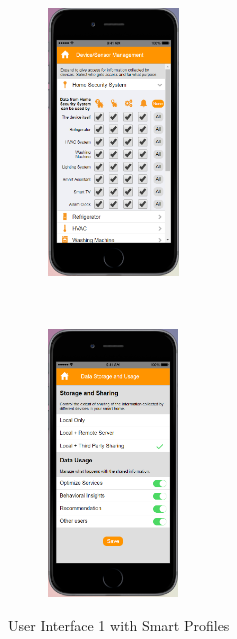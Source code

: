 \begin{appendices}
\begin{figure}[htb]
\begin{subfigure}[t]{0.2\textwidth}
	\end{subfigure}%
	~~~~~
	\begin{subfigure}[t]{0.2\textwidth}
		\centering
		\includegraphics[height=2.8in]{figures/ui1sp4.png}
	\end{subfigure}%
	~~~~~
	\begin{subfigure}[t]{0.2\textwidth}
		\centering
		\includegraphics[height=2.8in]{figures/ui1sp5.png}
	\end{subfigure}%
	\caption{User Interface 1 with Smart Profiles}
	\label{fig:ui1Profiles}
\end{figure}


\end{appendices}
